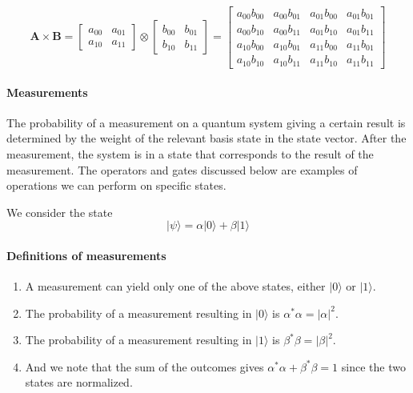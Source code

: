 \[
\bm{A} \times \bm{B} = \begin{bmatrix} a_{00} & a_{01} \\ a_{10} & a_{11} \end{bmatrix} \otimes \begin{bmatrix} b_{00} & b_{01} \\ b_{10} & b_{11} \end{bmatrix} =
\begin{bmatrix} a_{00} b_{00} &  a_{00}b_{01} & a_{01} b_{00} & a_{01}b_{01} \\
                a_{00} b_{10} &  a_{00}b_{11} & a_{01} b_{10} & a_{01}b_{11} \\
                a_{10} b_{00} &  a_{10}b_{01} & a_{11} b_{00} & a_{11}b_{01} \\
                a_{10} b_{10} &  a_{10}b_{11} & a_{11} b_{10} & a_{11}b_{11} \end{bmatrix}
\]


\paragraph{Measurements}

The probability of a measurement on a quantum system giving a certain
result is determined by the weight of the relevant basis state in the
state vector. After the measurement, the system is in a state that
corresponds to the result of the measurement. The operators and
gates discussed below are examples of operations we can perform on
specific states.

We  consider the state
\[
\vert \psi\rangle = \alpha \vert 0 \rangle +\beta \vert 1 \rangle
\]


\paragraph{Definitions of measurements}

\begin{enumerate}
\item A measurement can yield only one of the above states, either $\vert 0\rangle$ or $\vert 1\rangle$.

\item The probability of a measurement resulting in $\vert 0\rangle$ is $\alpha^*\alpha = \vert \alpha \vert^2$.

\item The probability of a measurement resulting in $\vert 1\rangle$ is $\beta^*\beta = \vert \beta \vert^2$.

\item And we note that the sum of the outcomes gives $\alpha^*\alpha+\beta^*\beta=1$ since the two states are normalized.
\end{enumerate}


